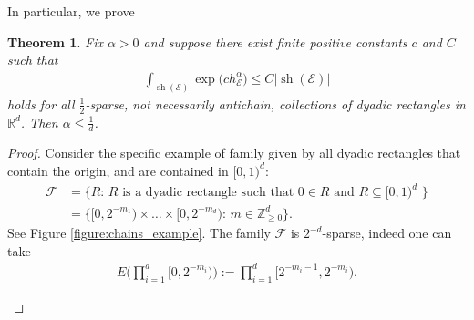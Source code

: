 \documentclass[oneside]{amsart}
\newtheorem{theorem}{Theorem}
\theoremstyle{definition}
\theoremstyle{plain}
\numberwithin{equation}{section}
\numberwithin{theorem}{section}
\newcommand{\sh}{\operatorname{sh}}
\begin{document}
In particular, we prove
\begin{theorem}
  Fix $\alpha > 0$ and suppose there exist finite positive constants
  $c$ and $C$ such that
  \begin{align*}
    \int_{\sh(\mathcal{E})} \exp\big( c h_{\mathcal{E}}^\alpha \big)
    \leq C |\sh(\mathcal{E})|
  \end{align*}
  holds for all $\frac{1}{2}$-sparse, not necessarily antichain, collections of
  dyadic rectangles in $\mathbb{R}^d$.
  Then $\alpha \leq \frac{1}{d}$.
\end{theorem}
\begin{proof}
  Consider the specific example of family given by all dyadic rectangles
  that contain the origin, and are contained in $[0,1)^d$:
  \begin{align*}
    \mathcal{F} &= \big\{R:\,
    \text{$R$ is a dyadic rectangle such that
    $0 \in R$ and $R \subseteq [0,1)^d$
    }
    \big\} \\
    &= \big\{\big[0,2^{-m_1}\big) \times \dots \times \big[0,2^{-m_d}\big):\,
    m \in \mathbb{Z}_{\geq 0}^d \big\}.
  \end{align*}
  See Figure \ref{figure:chains_example}.
  The family $\mathcal{F}$ is $2^{-d}$-sparse, indeed one can take
  \begin{align*}
    E\Bigg(\prod_{i=1}^d \big[0,2^{-m_i}\big)\Bigg)
    := \prod_{i=1}^d \big[2^{-m_i-1}, 2^{-m_i}\big).
  \end{align*}
  \begin{figure}[htpb!]
    \centering
\end{figure}
\end{proof}
\end{document}
